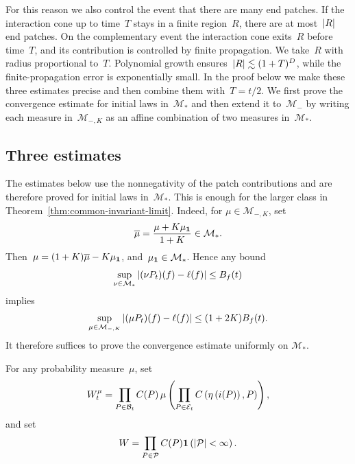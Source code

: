 For this reason we also control the event that there are many end patches. If
the interaction cone up to time~$T$ stays in a finite region~$R$, there are at
most~$\left|R\right|$ end patches. On the complementary event the interaction cone exits~$R$ before time~$T$, and its contribution is controlled by finite propagation. We take~$R$ with radius
proportional to~$T$. Polynomial growth ensures~$\left|R\right|\lesssim(1+T)^D$, while the
finite-propagation error is exponentially small. In the proof below we make these
three estimates precise and then combine them with~$T=t/2$. We first prove the convergence estimate for initial laws in~$\mathcal M_*$ and then extend it to~$\mathcal M_-$ by writing each measure in~$\mathcal M_{-,K}$ as an affine combination of two measures in~$\mathcal M_*$.

\subsection{Three estimates}
\label{subsec:convergence-three-estimates}

The estimates below use the nonnegativity of the patch contributions and are
therefore proved for initial laws in~$\mathcal M_*$. This is enough for the
larger class in Theorem~\ref{thm:common-invariant-limit}. Indeed, for
$\mu\in\mathcal M_{-,K}$, set
\begin{equation*}
\overline\mu
=
\frac{\mu+K\mu_{\mathbf{1}}}{1+K}
\in\mathcal M_*.
\end{equation*}
Then~$\mu=(1+K)\overline\mu-K\mu_{\mathbf{1}}$, and~$\mu_{\mathbf{1}}\in\mathcal M_*$. Hence any bound
\begin{equation*}
\sup_{\nu\in\mathcal M_*}
\left|(\nu P_t)(f)-\ell(f)\right|
\leq B_f(t)
\end{equation*}
implies
\begin{equation}
\label{eq:m-minus-reduction}
\sup_{\mu\in\mathcal M_{-,K}}
\left|(\mu P_t)(f)-\ell(f)\right|
\leq
(1+2K)B_f(t).
\end{equation}
It therefore suffices to prove the convergence estimate uniformly on
$\mathcal M_*$.

For any probability measure~$\mu$, set
\begin{equation}
\label{eq:finite-horizon-weight}
W_t^\mu
=
\prod_{P\in\mathcal B_t}C(P)\,
\mu\left(
 \prod_{P\in\mathcal E_t}
 C\left(\eta\left(i(P)\right),P\right)
\right),
\end{equation}
and set
\begin{equation*}
W
=
\prod_{P\in\mathcal P}C(P)
\mathbf{1}\left(\left|\mathcal P\right|<\infty\right).
\end{equation*}

